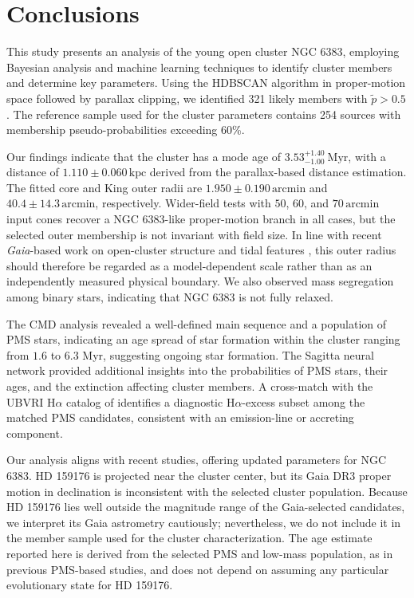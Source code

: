 \documentclass{aa}
\begin{document}
\section{Conclusions}\label{sec:conclusion}

This study presents an analysis of the young open cluster NGC 6383, employing Bayesian analysis and machine learning techniques to identify cluster members and determine key parameters. Using the HDBSCAN algorithm in proper-motion space followed by parallax clipping, we identified 321 likely members with $\tilde{p}>0.5$. The reference sample used for the cluster parameters contains 254 sources with membership pseudo-probabilities exceeding 60\%.

Our findings indicate that the cluster has a mode age of $3.53^{+1.40}_{-1.00}~\mathrm{Myr}$, with a distance of $1.110 \pm 0.060\,\mathrm{kpc}$ derived from the parallax-based distance estimation. The fitted core and King outer radii are $1.950 \pm 0.190\,\mathrm{arcmin}$ and $40.4 \pm 14.3\,\mathrm{arcmin}$, respectively. Wider-field tests with $50$, $60$, and $70\,\mathrm{arcmin}$ input cones recover a NGC 6383-like proper-motion branch in all cases, but the selected outer membership is not invariant with field size. In line with recent \textit{Gaia}-based work on open-cluster structure and tidal features \citep{2025MNRAS.539.2513A,2025A&A...694A.258R,2025A&A...698A.156X}, this outer radius should therefore be regarded as a model-dependent scale rather than as an independently measured physical boundary. We also observed mass segregation among binary stars, indicating that NGC 6383 is not fully relaxed.

The CMD analysis revealed a well-defined main sequence and a population of PMS stars, indicating an age spread of star formation within the cluster ranging from $1.6$ to $6.3$ Myr, suggesting ongoing star formation. The Sagitta neural network provided additional insights into the probabilities of PMS stars, their ages, and the extinction affecting cluster members. A cross-match with the UBVRI H$\alpha$ catalog of \citet{2010AA...511A..25R} identifies a diagnostic H$\alpha$-excess subset among the matched PMS candidates, consistent with an emission-line or accreting component.

Our analysis aligns with recent studies, offering updated parameters for NGC 6383. HD 159176 is projected near the cluster center, but its Gaia DR3 proper motion in declination is inconsistent with the selected cluster population. Because HD 159176 lies well outside the magnitude range of the Gaia-selected candidates, we interpret its Gaia astrometry cautiously; nevertheless, we do not include it in the member sample used for the cluster characterization. The age estimate reported here is derived from the selected PMS and low-mass population, as in previous PMS-based studies, and does not depend on assuming any particular evolutionary state for HD 159176.
\end{document}
